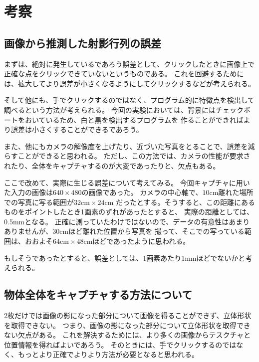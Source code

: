 \documentclass[11pt,a4j]{jsarticle}
\begin{document}
\section{考察}
\label{sec:考察}

\subsection{画像から推測した射影行列の誤差}
\label{sub:画像から推測した射影行列の誤差}

まずは、絶対に発生しているであろう誤差として、クリックしたときに画像上で正確な点をクリックできていないというものである。
これを回避するためには、拡大してより誤差が小さくなるようにしてクリックするなどが考えられる。

そして他にも、手でクリックするのではなく、プログラム的に特徴点を検出して調べるという方法が考えられる。
今回の実験においては、背景にはチェックボートをおいているため、白と黒を検出するプログラムを
作ることができればより誤差は小さくすることができるであろう。

また、他にもカメラの解像度を上げたり、近づいた写真をとることで、誤差を減らすことができると思われる。
ただし、この方法では、カメラの性能が要求されたり、全体をキャプチャするのが大変であったりと、欠点もある。

ここで改めて、実際に生じる誤差について考えてみる。
今回キャプチャに用いた入力の画像は$640 \times 480$の画像であった。
カメラの中心軸で、$10\mathrm{cm}$離れた場所での写真に写る範囲が$32\mathrm{cm} \times 24\mathrm{cm}$
だったとする。そうすると、この距離にあるものをポイントしたとき1画素のずれがあったとすると、
実際の距離としては、0.5mmとなる。
正確に測っていたわけではないので、データの有意性はあまりありませんが、30cmほど離れた位置から写真を
撮って、そこでの写っている範囲は、おおよそ$64\mathrm{cm} \times 48\mathrm{cm}$ほどであったように思われる。

もしそうであったとすると、誤差としては、1画素あたり1mmほどでないかと考えられる。

\subsection{物体全体をキャプチャする方法について}
\label{sub:物体全体をキャプチャする方法について}

2枚だけでは画像の影になった部分について画像を得ることができず、立体形状を取得できない。
つまり、画像の影になった部分について立体形状を取得できない欠点がある。
これを解決するためには、より多くの画像からテスクチャと位置情報を得ればよいであろう。
そのときには、手でクリックするのではなく、もっとより正確でよりより方法が必要となると思われる。
\end{document}
